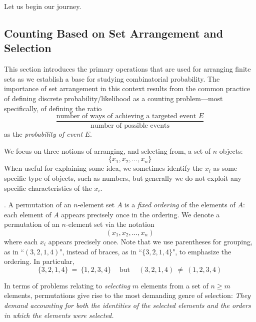 \smallskip

Let us begin our journey.

\subsection{Counting Based on Set Arrangement and Selection}
\label{sec:set-arrangement}

This section introduces the primary operations that are used for arranging finite sets as we
establish a base for studying combinatorial probability.  The importance of set arrangement in this context results from the common practice of defining discrete probability/likelihood as a counting problem---most specifically, of defining the ratio
\begin{equation}
\label{eq:prob-def-ratio}
\frac{\mbox{number of ways of achieving a targeted event $E$}}{\mbox{number of possible events}}
\end{equation}
as the {\it probability of event} $E$.


\medskip

We focus on three notions of arranging, and selecting from, a set of $n$ objects:
\[ \{ x_1, x_2, \ldots , x_n\} \]
When useful for explaining some idea, we sometimes identify the $x_i$ as some specific type
of objects, such as numbers, but generally we do not exploit any specific characteristics of the $x_i$.

\medskip


.
A permutation of an $n$-element set $A$ is a {\em fixed ordering} of the elements of $A$: each element of $A$ appears precisely once in the ordering.  We denote a permutation of an $n$-element set via the notation
\[ (x_1, x_2, \ldots , x_n) \]
where each $x_i$ appears precisely once.  Note that we use parentheses for grouping, as in ``$(3,2,1,4)$", instead of braces, as in ``$\{3,2,1,4\}$", to emphasize the ordering.  In particular,
\[ \{3,2,1,4\} \ = \ \{1,2,3, 4\} \ \ \ \ \mbox{ but } \ \ \ \ (3,2,1,4) \ \neq \ (1, 2, 3,4) \]

\medskip


In terms of problems relating to {\em selecting} $m$ elements from a set of $n \geq m$ elements, permutations give rise to the most demanding genre of selection: {\em They demand accounting for both the {\em identities} of the selected elements and the {\em orders} in which the elements were selected.}

